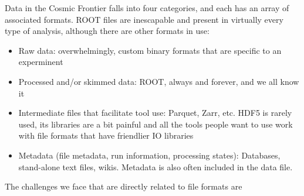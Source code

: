 \begin{comment}
Harrison B. Prosper, Sezen Sekmen, Gokhan Unel. ”Analysis Description Language: A DSL for HEP Analysis”, arXiv:2203.09886 [hep-ph] (pdf). (also relevant to CompF07)~\cite{Prosper:2022lnf}
- emphasizes the need for semantic analysis to make collaboration with theory easier
- also makes an analysis self-documenting (Amy: to a degree)
- prefers a language-independent DSL, an "external DSL" for easier interoperability
- identifies DSL requirements as (1) easily understood by a physicist, (2) unambiguous, (3) domain complete.  I feel like (1) and possibly (2) need more clarification for this to be a true requirement list
- people do use the Analysis Description Language (analysis schools, Future Circular Collider studies), not clear if the use is limited to a specific group or groups, no complete LHC analysis yet
- Obvious enhancement of existing DSL would be to re-write to target LLVM.  (Amy: huh, okay, maybe it is time to think about DSLs?)

C. Backhouse. ”The CAFAna framework for neutrino analysis”, arXiv:2203.13768 [hep-ex] (pdf). (also under NF01)~\cite{arxiv.2203.13768}
- I feel like I need to re-read this paper (Amy)
- ROOT format files
- has been used by multiple neutrino experiments!
- connected with STAN to provide MCMC + analytic derivatives
\end{comment}

Data in the Cosmic Frontier falls into four categories, and each has an array of associated formats.  ROOT files are inescapable and present in virtually every type of analysis, although there are other formats in use:   

\begin{itemize}
  \item Raw data: overwhelmingly, custom binary formats that are specific to an experminent
  \item Processed and/or skimmed data: ROOT, always and forever, and we all know it
  \item Intermediate files that facilitate tool use: Parquet, Zarr, etc.  HDF5 is rarely used, its libraries are a bit painful and all the tools people want to use work with file formats that have friendlier IO libraries
  \item Metadata (file metadata, run information, processing states): Databases, stand-alone text files, wikis.  Metadata is also often included in the data file.
\end{itemize}

The challenges we face that are directly related to file formats are

